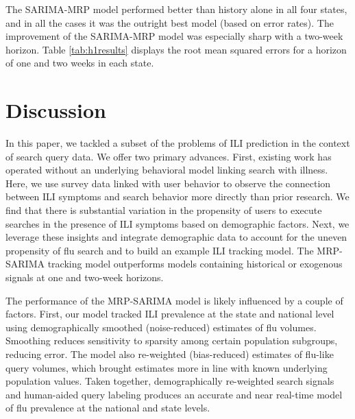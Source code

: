\documentclass[fleqn,10pt]{wlscirep}
\begin{document}
The SARIMA-MRP model performed better than history alone in all four states, and in all the cases it was the outright best model (based on error rates). The improvement of the SARIMA-MRP model was especially sharp with a two-week horizon. Table \ref{tab:h1results} displays the root mean squared errors for a horizon of one and two weeks in each state. 

\begin{table}[tbp]
\centering
\caption{State-level tracking model RMSE (h = 1 week/h = 2 weeks). Bold text indicates minimum values.}
\label{tab:h1results}
\end{table}

\section*{Discussion}

In this paper, we tackled a subset of the problems of ILI prediction in the context of search query data. We offer two primary advances. First, existing work has operated without an underlying behavioral model linking search with illness. Here, we use survey data linked with user behavior to observe the connection between ILI symptoms and search behavior more directly than prior research. We find that there is substantial variation in the propensity of users to execute searches in the presence of ILI symptoms based on demographic factors. Next, we leverage these insights and integrate demographic data to account for the uneven propensity of flu search and to build an example ILI tracking model. The MRP-SARIMA tracking model outperforms models containing historical or exogenous signals at one and two-week horizons.

The performance of the MRP-SARIMA model is likely influenced by a couple of factors. First, our model tracked ILI prevalence at the state and national level using demographically smoothed (noise-reduced) estimates of flu volumes. Smoothing reduces sensitivity to sparsity among certain population subgroups, reducing error\cite{wang2015forecasting}. The model also re-weighted (bias-reduced) estimates of flu-like query volumes, which brought estimates more in line with known underlying population values. Taken together, demographically re-weighted search signals and human-aided query labeling produces an accurate and near real-time model of flu prevalence at the national and state levels.
\end{document}
